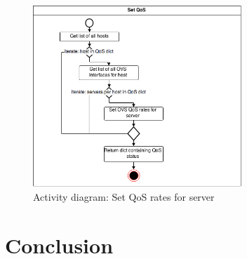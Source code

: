 \begin{figure}[H]
\centering

\includegraphics[width=0.7\textwidth]{images/design/activity_set_qos}

\caption{Activity diagram: Set QoS rates for server}
\end{figure}



\section{Conclusion}